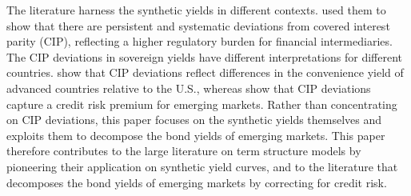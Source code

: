 {The literature harness the synthetic yields in different contexts.
\cite*{DuTepperVerdelhan:2018} used them to show that there are persistent and systematic deviations from covered interest parity (CIP), reflecting a higher regulatory burden for financial intermediaries. 
The CIP deviations in sovereign yields have different interpretations for different countries.
\cite*{DuImSchreger:2018JIE} show that CIP deviations reflect differences in the convenience yield of advanced countries relative to the U.S., whereas \cite{DuSchreger:2016JoF} show that CIP deviations capture a credit risk premium for emerging markets.
Rather than concentrating on CIP deviations, this paper focuses on the synthetic yields themselves and exploits them to decompose the bond yields of emerging markets.
This paper therefore contributes to the large literature on term structure models by pioneering their application on synthetic yield curves, and to the literature that decomposes the bond yields of emerging markets \citep*{BlakeRuleRummel:2015,ACDM:2019} by correcting for credit risk. 


}

